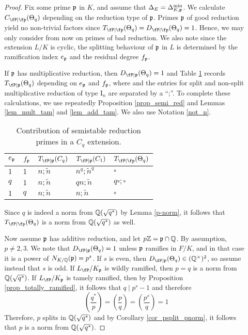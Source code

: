 \begin{proof}
    Fix some prime $\mathfrak{p}$ in $K$, and assume that $\Delta_E=\Delta_{E,\mathfrak{p}}^{\min}$. We calculate $\Cp(\Theta_q)$ depending on the reduction type of $\mathfrak{p}$. Primes $\mathfrak{p}$ of good reduction yield no non-trivial factors since $\Tp(\Theta_q)=\Dp(\Theta_q)=1$. Hence, we may only consider from now on primes of bad reduction. We also note since the extension $L/K$ is cyclic, the splitting behaviour of $\mathfrak{p}$ in $L$ is determined by the ramification index $e_{\mathfrak{p}}$ and the residual degree $f_{\mathfrak{p}}$. 
    
    If $\mathfrak{p}$ has multiplicative reduction, then $D_{\fP\mid\pp}(\Theta_q)=1$ and Table \ref{table_Cp} records $T_{\fP\mid\pp}(\Theta_q)$ depending on $e_{\mathfrak{p}}$ and $f_{\mathfrak{p}}$, where and the entries for split and non-split multiplicative reduction of type $\mathrm{I}_n$ are separated by a ``;''. To complete these calculations, we use repeatedly Proposition \ref{prop_semi_red} and Lemmas \ref{lem_mult_tam} and \ref{lem_add_tam}. We also use Notation \ref{not_n}.

    \begin{table}[!ht]
        \centering
        \begin{tabular}{|l|l|l|l|l|}
        \hline
        $e_{\mathfrak{p}}$ & $f_{\mathfrak{p}}$  & $T_{\fP\mid \pp}(C_q)$ & $T_{\fP\mid \pp}(C_1)$  & $\Tp(\Theta_q)$ \\ \hline
        $1$ & $1$ & $n;\tilde{n}$ & $n^q;\tilde{n}^q$ & $\square$ \\ \hline
        $q$ & $1$ & $n;\tilde{n}$ & $qn;\tilde{n}$ & $q\square;\square$ \\ \hline
        $1$ & $q$ & $n;\tilde{n}$ & $n;\tilde{n}$ & $\square$ \\ \hline
        \end{tabular}
        \caption{Contribution of semistable reduction primes in a $C_q$ extension.}
        \label{table_Cp}
    \end{table}

    Since $q$ is indeed a norm from $\mathbb{Q}(\sqrt{q^*})$ by Lemma \ref{p-norm}, it follows that $\Tp(\Theta_q)$ is a norm from $\mathbb{Q}(\sqrt{q^*})$ as well.

    Now assume $\mathfrak{p}$ has additive reduction, and let $p\mathbb{Z}=\mathfrak{p}\cap\mathbb{Q}$. By assumption, $p\neq2,3$. We note that $D_{\fP\mid\pp}(\Theta_q)=1$ unless $\mathfrak{p}$ ramifies in $F/K$, and in that case it is a power of $N_{K/\mathbb{Q}}(\mathfrak{p})=p^s$. If $s$ is even, then $D_{\fP\mid\pp}(\Theta_q)\in\QQss$, so assume instead that $s$ is odd. If $L_\fP/K_\pp$ is wildly ramified, then $p=q$ is a norm from $\mathbb{Q}(\sqrt{q^*})$. If $L_\fP/K_\pp$ is tamely ramified, then by Proposition \ref{prop_totally_ramified}, it follows that $q\mid p^s-1$ and therefore 
    \begin{equation}
        \left(\frac{q^*}{p}\right)=\left(\frac{p}{q}\right)=\left(\frac{p^s}{q}\right)=1
    \end{equation}
    Therefore, $p$ splits in $\mathbb{Q}(\sqrt{q^*})$ and by Corollary \ref{cor_psplit_pnorm}, it follows that $p$ is a norm from $\mathbb{Q}(\sqrt{q^*})$. 
    

\end{proof}
